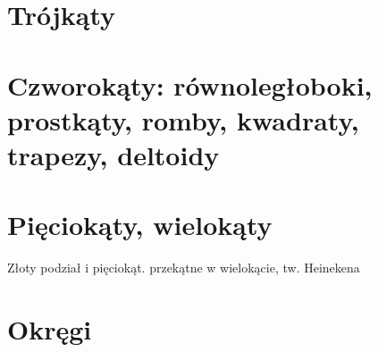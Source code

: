 
\section{Trójkąty}


\section{Czworokąty: równoległoboki, prostkąty, romby, kwadraty, trapezy, deltoidy}


\section{Pięciokąty, wielokąty}
Złoty podział i pięciokąt.
%
przekątne w wielokącie, tw. Heinekena %

\section{Okręgi}




